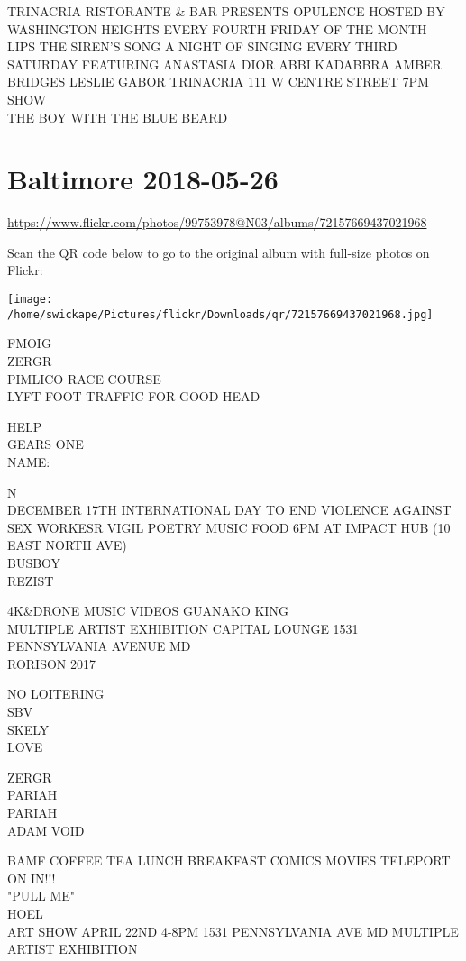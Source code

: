 \documentclass[10pt,letterpaper]{article}
\begin{document}
TRINACRIA RISTORANTE \& BAR PRESENTS OPULENCE HOSTED BY WASHINGTON HEIGHTS EVERY FOURTH FRIDAY OF THE MONTH\\
LIPS THE SIREN'S SONG A NIGHT OF SINGING EVERY THIRD SATURDAY FEATURING ANASTASIA DIOR ABBI KADABBRA AMBER BRIDGES LESLIE GABOR TRINACRIA 111 W CENTRE STREET 7PM SHOW\\
THE BOY WITH THE BLUE BEARD


\section*{Baltimore 2018-05-26}

\url{https://www.flickr.com/photos/99753978@N03/albums/72157669437021968}

Scan the QR code below to go to the original album with full-size photos on Flickr:

\texttt{[image: /home/swickape/Pictures/flickr/Downloads/qr/72157669437021968.jpg]}


FMOIG\\
ZERGR\\
PIMLICO RACE COURSE\\
LYFT FOOT TRAFFIC FOR GOOD HEAD

HELP\\
GEARS ONE\\
NAME:

N\\
DECEMBER 17TH INTERNATIONAL DAY TO END VIOLENCE AGAINST SEX WORKESR VIGIL POETRY MUSIC FOOD 6PM AT IMPACT HUB (10 EAST NORTH AVE)\\
BUSBOY\\
REZIST

4K\&DRONE MUSIC VIDEOS GUANAKO KING\\
MULTIPLE ARTIST EXHIBITION CAPITAL LOUNGE 1531 PENNSYLVANIA AVENUE MD\\
RORISON 2017

NO LOITERING\\
SBV\\
SKELY\\
LOVE

ZERGR\\
PARIAH\\
PARIAH\\
ADAM VOID

BAMF COFFEE TEA LUNCH BREAKFAST COMICS MOVIES TELEPORT ON IN!!!\\
"PULL ME"\\
HOEL\\
ART SHOW APRIL 22ND 4{-}8PM 1531 PENNSYLVANIA AVE MD MULTIPLE ARTIST EXHIBITION
\end{document}
